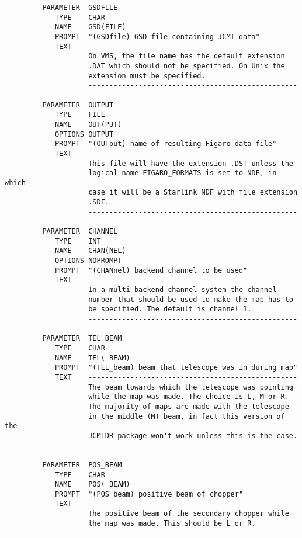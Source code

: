 \documentclass[twoside,11pt]{article}
\renewcommand{\_}{\texttt{\symbol{95}}}
\begin{document}
\begin{small}
\begin{verbatim}
         PARAMETER  GSDFILE
            TYPE    CHAR
            NAME    GSD(FILE)
            PROMPT  "(GSDfile) GSD file containing JCMT data"
            TEXT    --------------------------------------------------
                    On VMS, the file name has the default extension
                    .DAT which should not be specified. On Unix the
                    extension must be specified.
                    --------------------------------------------------

         PARAMETER  OUTPUT
            TYPE    FILE
            NAME    OUT(PUT)
            OPTIONS OUTPUT
            PROMPT  "(OUTput) name of resulting Figaro data file"
            TEXT    --------------------------------------------------
                    This file will have the extension .DST unless the
                    logical name FIGARO_FORMATS is set to NDF, in which
                    case it will be a Starlink NDF with file extension
                    .SDF.
                    --------------------------------------------------

         PARAMETER  CHANNEL
            TYPE    INT
            NAME    CHAN(NEL)
            OPTIONS NOPROMPT
            PROMPT  "(CHANnel) backend channel to be used"
            TEXT    --------------------------------------------------
                    In a multi backend channel system the channel
                    number that should be used to make the map has to
                    be specified. The default is channel 1.
                    --------------------------------------------------

         PARAMETER  TEL_BEAM
            TYPE    CHAR
            NAME    TEL(_BEAM)
            PROMPT  "(TEL_beam) beam that telescope was in during map"
            TEXT    --------------------------------------------------
                    The beam towards which the telescope was pointing
                    while the map was made. The choice is L, M or R.
                    The majority of maps are made with the telescope
                    in the middle (M) beam, in fact this version of the
                    JCMTDR package won't work unless this is the case.
                    --------------------------------------------------

         PARAMETER  POS_BEAM
            TYPE    CHAR
            NAME    POS(_BEAM)
            PROMPT  "(POS_beam) positive beam of chopper"
            TEXT    --------------------------------------------------
                    The positive beam of the secondary chopper while
                    the map was made. This should be L or R.
                    --------------------------------------------------
\end{verbatim}
\end{small}
\end{document}
